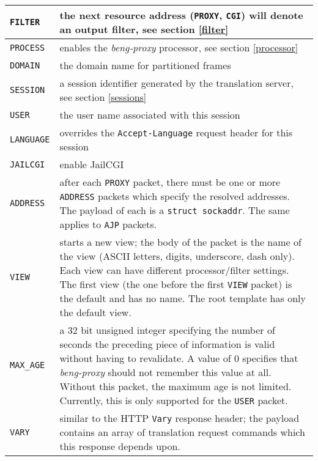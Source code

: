 \documentclass[a4paper,12pt]{article}
\begin{document}
\begin{tabular}{|l|p{10cm}|}
\hline

\texttt{FILTER} & the next resource address (\texttt{PROXY},
\texttt{CGI}) will denote an output filter, see section \ref{filter}
\\

\hline

\texttt{PROCESS} & enables the \emph{beng-proxy} processor, see
section \ref{processor} \\

\hline

\texttt{DOMAIN} & the domain name for partitioned frames \\

\hline

\texttt{SESSION} & a session identifier generated by the translation
server, see section \ref{sessions} \\

\hline

\texttt{USER} & the user name associated with this session \\

\hline

\texttt{LANGUAGE} & overrides the \texttt{Accept-Language} request
header for this session \\
\hline

\texttt{JAILCGI} & enable JailCGI \\

\hline

\texttt{ADDRESS} & after each \texttt{PROXY} packet, there must be one
or more \texttt{ADDRESS} packets which specify the resolved addresses.
The payload of each is a \texttt{struct sockaddr}.
The same applies to \texttt{AJP} packets. \\

\hline

\texttt{VIEW} & starts a new view; the body of the packet is the name
of the view (ASCII letters, digits, underscore, dash only).  Each view
can have different processor/filter settings.  The first view (the one
before the first \texttt{VIEW} packet) is the default and has no
name.  The root template has only the default view. \\

\hline

\texttt{MAX\_AGE} & a 32 bit unsigned integer specifying the number of
seconds the preceding piece of information is valid without having to
revalidate.  A value of 0 specifies that \emph{beng-proxy} should not
remember this value at all.  Without this packet, the maximum age is
not limited.  Currently, this is only supported for the \texttt{USER}
packet.  \\

\hline

\texttt{VARY} & similar to the HTTP \texttt{Vary} response header;
the payload contains an array of translation request commands which
this response depends upon. \\

\hline
\end{tabular}
\end{document}
